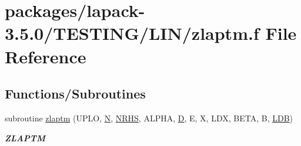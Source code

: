 \hypertarget{zlaptm_8f}{}\section{packages/lapack-\/3.5.0/\+T\+E\+S\+T\+I\+N\+G/\+L\+I\+N/zlaptm.f File Reference}
\label{zlaptm_8f}
\subsection*{Functions/\+Subroutines}
\begin{DoxyCompactItemize}
\item 
subroutine \hyperlink{group__complex16__lin_gad53f05c03f73f161fa4b238c0083e120}{zlaptm} (U\+P\+L\+O, \hyperlink{polmisc_8c_a0240ac851181b84ac374872dc5434ee4}{N}, \hyperlink{example__user_8c_aa0138da002ce2a90360df2f521eb3198}{N\+R\+H\+S}, A\+L\+P\+H\+A, \hyperlink{odrpack_8h_a7dae6ea403d00f3687f24a874e67d139}{D}, E, X, L\+D\+X, B\+E\+T\+A, B, \hyperlink{example__user_8c_a50e90a7104df172b5a89a06c47fcca04}{L\+D\+B})
\begin{DoxyCompactList}\small\item\em {\bfseries Z\+L\+A\+P\+T\+M} \end{DoxyCompactList}\end{DoxyCompactItemize}
